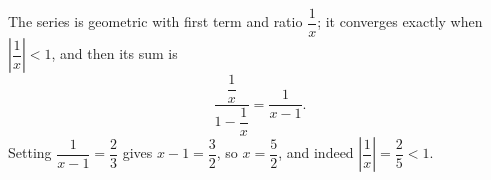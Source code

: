 The series is geometric with first term and ratio $\dfrac1x$; it converges exactly when $\left|\dfrac1x\right|<1$, and then its sum is
\[\dfrac{\dfrac1x}{1-\dfrac1x}=\dfrac{1}{x-1}.\]
Setting $\dfrac1{x-1}=\dfrac23$ gives $x-1=\dfrac32$, so $x=\boxed{\dfrac52}$, and indeed $\left|\dfrac1x\right|=\dfrac25<1$.
